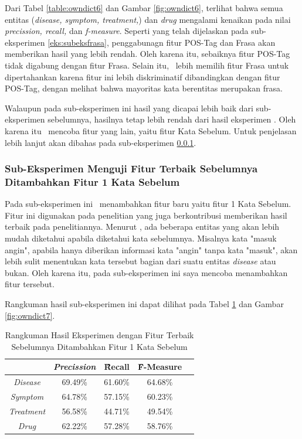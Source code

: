	Dari Tabel \ref{table:owndict6} dan Gambar \ref{fig:owndict6}, terlihat bahwa semua entitas (\textit{disease, symptom, treatment,}) dan \textit{drug} mengalami kenaikan pada nilai \textit{precission, recall,} dan \textit{f-measure}. Seperti yang telah dijelaskan pada sub-eksperimen \ref{eks:subeksfrasa}, penggabunagn fitur POS-Tag dan Frasa akan memberikan hasil yang lebih rendah. Oleh karena itu, sebaiknya fitur POS-Tag tidak digabung dengan fitur Frasa. Selain itu, \saya~lebih memilih fitur Frasa untuk dipertahankan karena fitur ini lebih diskriminatif dibandingkan dengan fitur POS-Tag, dengan melihat bahwa mayoritas kata berentitas merupakan frasa.
	
	Walaupun pada sub-eksperimen ini hasil yang dicapai lebih baik dari sub-eksperimen sebelumnya, hasilnya tetap lebih rendah dari hasil eksperimen \cite{skripsiKakRadit}. Oleh karena itu \saya~mencoba fitur yang lain, yaitu fitur Kata Sebelum. Untuk penjelasan lebih lanjut akan dibahas pada sub-eksperimen \ref{eks:subekswbef1}.
	
	\subsubsection{Sub-Eksperimen Menguji Fitur Terbaik Sebelumnya Ditambahkan Fitur 1 Kata Sebelum}\label{eks:subekswbef1}
	Pada sub-eksperimen ini \saya~menambahkan fitur baru yaitu fitur 1 Kata Sebelum. Fitur ini digunakan pada penelitian \cite{skripsiKakRadit} yang juga berkontribusi memberikan hasil terbaik pada penelitiannya. Menurut \saya, ada beberapa entitas yang akan lebih mudah diketahui apabila diketahui kata sebelumnya. Misalnya kata "masuk angin", apabila hanya diberikan informasi kata "angin" tanpa kata "masuk", akan lebih sulit menentukan kata tersebut bagian dari suatu entitas \textit{disease} atau bukan. Oleh karena itu, pada sub-eksperimen ini saya mencoba menambahkan fitur tersebut.
	
	Rangkuman hasil sub-eksperimen ini dapat dilihat pada Tabel \ref{table:owndict7} dan Gambar \ref{fig:owndict7}.
	
	\begin{table}
		\centering
		\caption{Rangkuman Hasil Eksperimen dengan Fitur Terbaik Sebelumnya Ditambahkan Fitur 1 Kata Sebelum}
		\begin{tabular}{|c|c|c|c|c|}
			\hline
		                          & \textit{Precission} & \f{\f{Recall}} & \f{\f{F-Measure}} \\ \hline
			\textit{Disease}      & 69.49\%             & 61.60\%        & 64.68\%           \\ \hline
			\textit{Symptom}      & 64.78\%             & 57.15\%        & 60.23\%           \\ \hline
			\textit{Treatment}    & 56.58\%             & 44.71\%        & 49.54\%           \\ \hline
			\textit{Drug}		  & 62.22\%             & 57.28\%        & 58.76\%           \\ \hline
		\end{tabular}
		\label{table:owndict7}
	\end{table}
	
